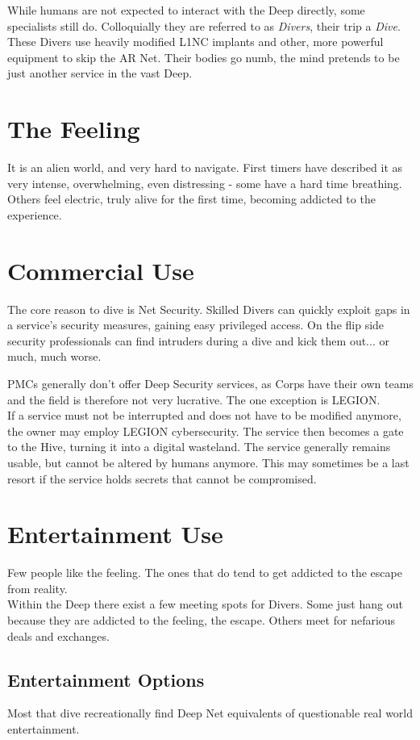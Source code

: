 While humans are not expected to interact with the Deep directly, some specialists still do.
Colloquially they are referred to as \emph{Divers}, their trip a \emph{Dive}.
\\%
These Divers use heavily modified L1NC implants and other, more powerful equipment to skip the AR Net.
Their bodies go numb, the mind pretends to be just another service in the vast Deep.
\section{The Feeling}
It is an alien world, and very hard to navigate.
First timers have described it as very intense, overwhelming, even distressing - some have a hard time breathing.
Others feel electric, truly alive for the first time, becoming addicted to the experience.
\section{Commercial Use}
The core reason to dive is Net Security.
Skilled Divers can quickly exploit gaps in a service's security measures, gaining easy privileged access.
On the flip side security professionals can find intruders during a dive and kick them out... or much, much worse.
\par
PMCs generally don't offer Deep Security services, as Corps have their own teams and the field is therefore not very lucrative.
The one exception is LEGION.
\\%
If a service must not be interrupted and does not have to be modified anymore, the owner may employ LEGION cybersecurity.
The service then becomes a gate to the Hive, turning it into a digital wasteland.
The service generally remains usable, but cannot be altered by humans anymore.
This may sometimes be a last resort if the service holds secrets that cannot be compromised.
\section{Entertainment Use}
Few people like the feeling.
The ones that do tend to get addicted to the escape from reality.
\\%
Within the Deep there exist a few meeting spots for Divers.
Some just hang out because they are addicted to the feeling, the escape.
Others meet for nefarious deals and exchanges.
\subsection{Entertainment Options}
Most that dive recreationally find Deep Net equivalents of questionable real world entertainment.
